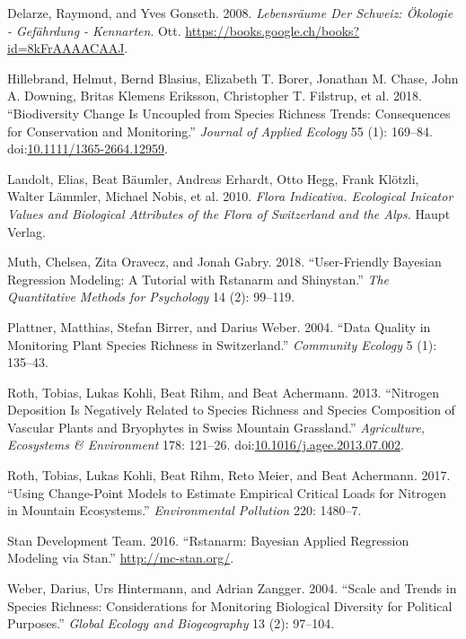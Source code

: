 \documentclass[fleqn,10pt,lineno]{wlpeerj} %
\theoremstyle{definition}
\theoremstyle{definition}
\theoremstyle{definition}
\theoremstyle{remark}
\begin{document}
\hypertarget{ref-Delarze2008}{}
Delarze, Raymond, and Yves Gonseth. 2008. \emph{Lebensräume Der Schweiz:
Ökologie - Gefährdung - Kennarten}. Ott.
\url{https://books.google.ch/books?id=8kFrAAAACAAJ}.

\hypertarget{ref-Hillebrand2018}{}
Hillebrand, Helmut, Bernd Blasius, Elizabeth T. Borer, Jonathan M.
Chase, John A. Downing, Britas Klemens Eriksson, Christopher T.
Filstrup, et al. 2018. ``Biodiversity Change Is Uncoupled from Species
Richness Trends: Consequences for Conservation and Monitoring.''
\emph{Journal of Applied Ecology} 55 (1): 169--84.
doi:\href{https://doi.org/10.1111/1365-2664.12959}{10.1111/1365-2664.12959}.

\hypertarget{ref-Landolt2010}{}
Landolt, Elias, Beat Bäumler, Andreas Erhardt, Otto Hegg, Frank Klötzli,
Walter Lämmler, Michael Nobis, et al. 2010. \emph{Flora Indicativa.
Ecological Inicator Values and Biological Attributes of the Flora of
Switzerland and the Alps.} Haupt Verlag.

\hypertarget{ref-Muth2018}{}
Muth, Chelsea, Zita Oravecz, and Jonah Gabry. 2018. ``User-Friendly
Bayesian Regression Modeling: A Tutorial with Rstanarm and Shinystan.''
\emph{The Quantitative Methods for Psychology} 14 (2): 99--119.

\hypertarget{ref-Plattner2004}{}
Plattner, Matthias, Stefan Birrer, and Darius Weber. 2004. ``Data
Quality in Monitoring Plant Species Richness in Switzerland.''
\emph{Community Ecology} 5 (1): 135--43.

\hypertarget{ref-Roth2013}{}
Roth, Tobias, Lukas Kohli, Beat Rihm, and Beat Achermann. 2013.
``Nitrogen Deposition Is Negatively Related to Species Richness and
Species Composition of Vascular Plants and Bryophytes in Swiss Mountain
Grassland.'' \emph{Agriculture, Ecosystems \& Environment} 178: 121--26.
doi:\href{https://doi.org/10.1016/j.agee.2013.07.002}{10.1016/j.agee.2013.07.002}.

\hypertarget{ref-Roth2017}{}
Roth, Tobias, Lukas Kohli, Beat Rihm, Reto Meier, and Beat Achermann.
2017. ``Using Change-Point Models to Estimate Empirical Critical Loads
for Nitrogen in Mountain Ecosystems.'' \emph{Environmental Pollution}
220: 1480--7.

\hypertarget{ref-Stan2016}{}
Stan Development Team. 2016. ``Rstanarm: Bayesian Applied Regression
Modeling via Stan.'' \url{http://mc-stan.org/}.

\hypertarget{ref-Weber2004}{}
Weber, Darius, Urs Hintermann, and Adrian Zangger. 2004. ``Scale and
Trends in Species Richness: Considerations for Monitoring Biological
Diversity for Political Purposes.'' \emph{Global Ecology and
Biogeography} 13 (2): 97--104.
\end{document}
